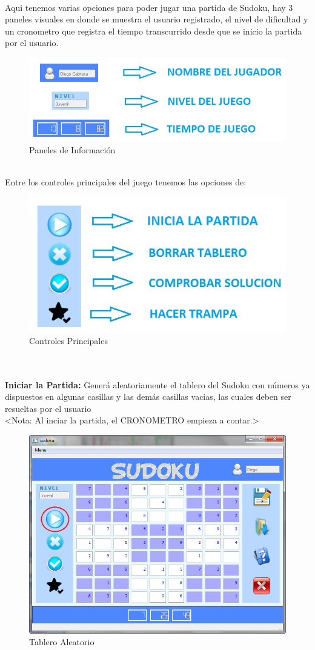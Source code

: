 \ \\ Aqui tenemos varias opciones para poder jugar una partida de Sudoku, hay 3 paneles visuales en donde se muestra el usuario registrado, el nivel de dificultad y un cronometro que registra el tiempo transcurrido desde que se inicio la partida por el usuario.

\begin{figure}[htbp]
\begin{center}
\includegraphics[width=.35\textwidth]{./imagenes/Panel.png}
\caption{Paneles de Información}
\label{Paneles de Información}
\end{center}
\end{figure} 

\ \\ Entre los controles principales del juego tenemos las opciones de: 

\begin{figure}[htbp]
\begin{center}
\includegraphics[width=.40\textwidth]{./imagenes/Controles1.png}
\caption{Controles Principales}
\label{Controles Principales}
\end{center}
\end{figure} 

\ \\ \ \\ \textbf{Iniciar la Partida:} Generá aleatoriamente el tablero del Sudoku con números ya dispuestos en algunas casillas y las demás casillas vacias, las cuales deben ser resueltas por el usuario \\ <Nota: Al inciar la partida, el CRONOMETRO empieza a contar.>  

\begin{figure}[htbp]
\begin{center}
\includegraphics[width=.50\textwidth]{./imagenes/Tablero.png}
\caption{Tablero Aleatorio}
\label{Tablero}
\end{center}
\end{figure} 

